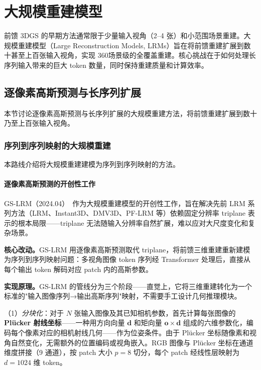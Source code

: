 

\section{大规模重建模型}
\label{sec:13_4}

前馈 3DGS 的早期方法通常限于少量输入视角（2--4 张）和小范围场景重建。大规模重建模型（Large Reconstruction Models, LRMs）旨在将前馈重建扩展到数十甚至上百张输入视角，实现 360\textdegree{}场景级的全覆盖重建。核心挑战在于如何处理长序列输入带来的巨大 token 数量，同时保持重建质量和计算效率。

\subsection{逐像素高斯预测与长序列扩展}
\label{ss:13_4a}

本节讨论逐像素高斯预测与长序列扩展的大规模重建方法，将前馈重建扩展到数十乃至上百张输入视角。

\subsubsection{序列到序列映射的大规模重建}

本路线介绍将大规模重建建模为序列到序列映射的方法。

\paragraph{逐像素高斯预测的开创性工作}

GS-LRM（2024.04）~\cite{2404_19702}作为大规模重建模型的开创性工作，旨在解决先前 LRM 系列方法（LRM、Instant3D、DMV3D、PF-LRM 等）依赖固定分辨率 triplane 表示的根本局限——triplane 无法随输入分辨率自然扩展，难以应对大尺度变化和复杂场景。

\textbf{核心改动。}GS-LRM 用逐像素高斯预测取代 triplane，将前馈三维重建重新建模为序列到序列映射问题：多视角图像 token 序列经 Transformer 处理后，直接从每个输出 token 解码对应 patch 内的高斯参数。

\textbf{实现原理。}GS-LRM 的管线分为三个阶段——直觉上，它将三维重建转化为一个标准的"输入图像序列→输出高斯序列"映射，不需要手工设计几何推理模块。

（1）\textit{分块化}：对于 $N$ 张输入图像及其已知相机参数，首先计算每张图像的 \textbf{Pl\"ucker 射线坐标}——一种用方向向量 $\mathbf{d}$ 和矩向量 $\mathbf{o} \times \mathbf{d}$ 组成的六维参数化，编码每个像素对应的相机射线几何——作为位姿条件。由于 Pl\"ucker 坐标随像素和视角自然变化，无需额外的位置编码或视角嵌入。RGB 图像与 Pl\"ucker 坐标在通道维度拼接（9 通道），按 patch 大小 $p=8$ 切分，每个 patch 经线性层映射为 $d=1024$ 维 token。

